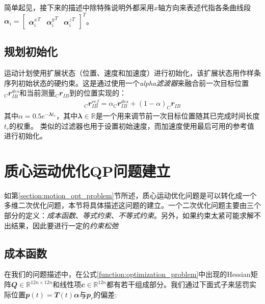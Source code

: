 简单起见，接下来的描述中除特殊说明外都采用$x$轴方向来表述代指各条曲线段$\mathbfit{\alpha}_i = \begin{bmatrix}{\mathbfit{\alpha}_i^x}^T & {\mathbfit{\alpha}_i^y}^T & {\mathbfit{\alpha}_i^z}^T\end{bmatrix}^T$。


\subsection[规划初始化]{\label{section:optimization_init}规划初始化}
运动计划使用扩展状态（位置、速度和加速度）进行初始化，该扩展状态用作样条序列初始状态的硬约束。这是通过使用一个\emph{alpha滤波器}来融合前一次目标位置$_C\mathbfit{r}_{IB}^{des}$和当前测量$_C\mathbfit{r}_{IB}$到的位置实现的：
\begin{align}
    _C\mathbfit{r}_{IB}^{ref}=\alpha _C\mathbfit{r}_{IB}^{des}+(1-\alpha)_C\mathbfit{r}_{IB}
\end{align}
其中$\alpha=0.5e^{-\mathbfit{\lambda} t_c}$，其中$\mathbfit{\lambda}\in \mathbb{R}$是一个用来调节前一次目标位置随其已完成时间长度$t_c$的权重。
类似的过滤器也用于设置初始速度，而加速度使用最后可用的参考值进行初始化。












\section[质心运动优化QP问题的建立]{\label{section:com_opt_setup}质心运动优化QP问题建立}
如第\ref{section:motion_opt_problem}节所述，质心运动优化问题是可以转化成一个多维二次优化问题，本节将具体描述这问题的建立。一个二次优化问题主要由三个部分的定义：\emph{成本函数}、\emph{等式约束}、\emph{不等式约束}。另外，如果约束太紧可能求解不出结果，因此要进行一定的\emph{约束松弛}

\subsection[成本函数]{\label{section:cost_function}成本函数}


在我们的问题描述中，在公式\eqref{function:optimization_problem}中出现的Hessian矩阵$\mathbfit{Q}\in\mathbb{R}^{12n\times12n}$和线性项$\mathbfit{c}\in\mathbb{R}^{12n}$都有若干组成部分。我们通过下面式子来惩罚实际位置$\mathbfit{p}(t)=\mathbfit{T}(t)\mathbfit{\alpha}$与$\mathbfit{p}_r$的偏差:

